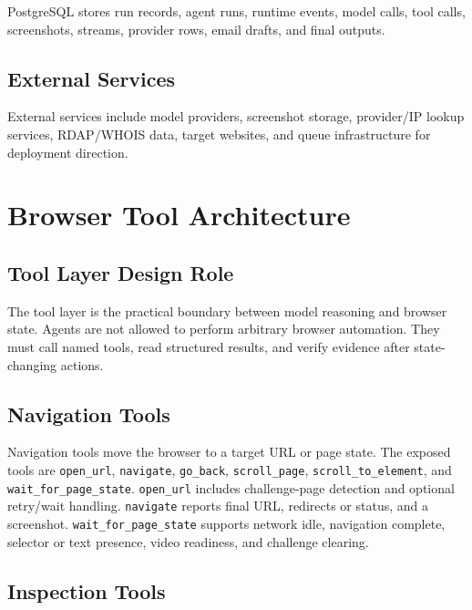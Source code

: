 PostgreSQL stores run records, agent runs, runtime events, model calls, tool
calls, screenshots, streams, provider rows, email drafts, and final outputs.

\subsection{External Services}

External services include model providers, screenshot storage, provider/IP
lookup services, RDAP/WHOIS data, target websites, and queue infrastructure for
deployment direction.

\section{Browser Tool Architecture}

\subsection{Tool Layer Design Role}

The tool layer is the practical boundary between model reasoning and browser
state. Agents are not allowed to perform arbitrary browser automation. They
must call named tools, read structured results, and verify evidence after
state-changing actions.



\subsection{Navigation Tools}

Navigation tools move the browser to a target URL or page state. The exposed
tools are \texttt{open\_url}, \texttt{navigate}, \texttt{go\_back},
\texttt{scroll\_page}, \texttt{scroll\_to\_element}, and
\texttt{wait\_for\_page\_state}. \texttt{open\_url} includes challenge-page
detection and optional retry/wait handling. \texttt{navigate} reports final
URL, redirects or status, and a screenshot. \texttt{wait\_for\_page\_state}
supports network idle, navigation complete, selector or text presence, video
readiness, and challenge clearing.

\subsection{Inspection Tools}

